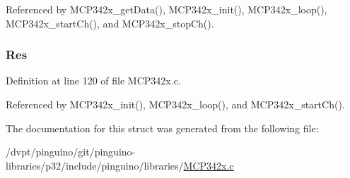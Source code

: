 Referenced by M\-C\-P342x\-\_\-get\-Data(), M\-C\-P342x\-\_\-init(), M\-C\-P342x\-\_\-loop(), M\-C\-P342x\-\_\-start\-Ch(), and M\-C\-P342x\-\_\-stop\-Ch().

\hypertarget{structtag_m_c_p342x_c_h_a8573f92bdf8f12f4d330c68aee4ce26a}{
\subsubsection[{Res}]{ Res}}\label{structtag_m_c_p342x_c_h_a8573f92bdf8f12f4d330c68aee4ce26a}


Definition at line 120 of file M\-C\-P342x.\-c.



Referenced by M\-C\-P342x\-\_\-init(), M\-C\-P342x\-\_\-loop(), and M\-C\-P342x\-\_\-start\-Ch().



The documentation for this struct was generated from the following file\-:\begin{DoxyCompactItemize}
\item 
/dvpt/pinguino/git/pinguino-\/libraries/p32/include/pinguino/libraries/\hyperlink{_m_c_p342x_8c}{M\-C\-P342x.\-c}\end{DoxyCompactItemize}
